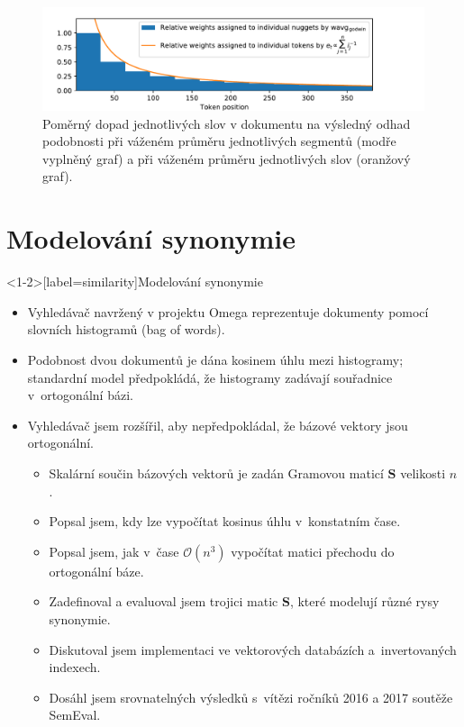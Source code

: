 \documentclass[aspectratio=169,t]{beamer}
\begin{document}
\begin{frame}[c]
\begin{figure}
\vfill
\begin{center}
\includegraphics[trim={0.8cm 0.0cm 2.8cm 0.5cm}, scale=0.8]{figs/quality-evaluation-4}
\end{center}
\caption{Poměrný dopad jednotlivých slov v dokumentu na výsledný odhad
  podobnosti při váženém průměru jednotlivých segmentů (modře vyplněný graf) a
  při váženém průměru jednotlivých slov (oranžový graf).}
\end{figure}
\end{frame}


\section{Modelování synonymie}
\begin{frame}<1-2>[label=similarity]{Modelování synonymie}
\begin{itemize}
  \item<1-> Vyhledávač navržený v projektu Omega reprezentuje dokumenty pomocí
    \alert<1>{slovních histogramů (bag of words)}.
  \item<2-> \alert<2>{Podobnost} dvou dokumentů \alert<2>{je dána kosinem úhlu}
    mezi histogramy; standardní model předpokládá, že \alert<2>{histogramy
    zadávají souřadnice v~ortogonální bázi}.
  \item<3-> Vyhledávač jsem rozšířil, aby \alert<3>{nepředpokládal, že
    bázové vektory jsou ortogonální}.
    \begin{itemize}
      \item<4-> \alert<4>{Skalární součin} bázových vektorů je \alert<4>{zadán
        Gramovou maticí $\mathbf S$} velikosti $n$.
      \item<5-> Popsal jsem, kdy lze \alert<5>{vypočítat kosinus úhlu
        v~konstatním čase}.
      \item<6-> Popsal jsem, jak \alert<6>{v~čase $\mathcal O(n^3)$ vypočítat matici
        přechodu do ortogonální báze}.
      \item<7-> Zadefinoval a evaluoval jsem trojici matic $\mathbf S$, které
        \alert<7>{modelují různé rysy synonymie}.
      \item<8-> Diskutoval jsem \alert<8>{implementaci ve vektorových databázích
        a~invertovaných indexech}.
      \item<9-> Dosáhl jsem \alert<9>{srovnatelných výsledků s~vítězi} ročníků 2016 a
        2017 soutěže SemEval.
    \end{itemize}
\end{itemize}
\end{frame}
\end{document}
